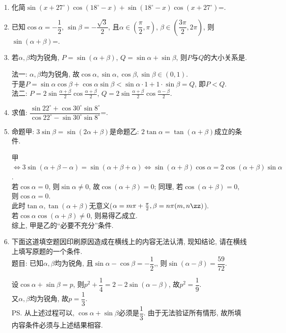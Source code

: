 \begin{enumerate}
\item 化简$\sin(x+27^\circ)\cos(18^\circ-x)+\sin(18^\circ-x)\cos(x+27^\circ)$=. 

\item 已知$\cos\alpha=-\dfrac{1}{2}$, $\sin\beta=-\dfrac{\sqrt{3}}{2}$, 且$\alpha\in\left(\dfrac{\pi}{2},\pi\right)$, $\beta\in\left(\dfrac{3\pi}{2},2\pi\right)$,
则$\sin(\alpha+\beta)$=. 

\item 若$\alpha,\beta$均为锐角, $P=\sin(\alpha+\beta)$, $Q=\sin\alpha+\sin\beta$, 则$P$与$Q$的大小关系是. 
\begin{jieda}
法一: $\alpha,\beta$均为锐角, 故$\cos\alpha,\sin\alpha,\cos\beta,\sin\beta\in(0,1)$. \\
于是$P=\sin\alpha\cos\beta+\cos\alpha\sin\beta<\sin\alpha\cdot 1+1\cdot\sin\beta=Q$, 即$P<Q$. \\
法二: $P=2\sin\frac{\alpha+\beta}{2}\cos\frac{\alpha+\beta}{2}$, $Q=2\sin\frac{\alpha+\beta}{2}\cos\frac{\alpha-\beta}{2}$. 
\end{jieda}

\item 求值: $\dfrac{\sin22^{\circ}+\cos30^{\circ}\sin8^{\circ}}{\cos22^{\circ}-\sin30^{\circ}\sin8^{\circ}}$=. 

\item 命题甲: $3\sin\beta=\sin(2\alpha+\beta)$是命题乙: $2\tan\alpha=\tan(\alpha+\beta)$成立的条件. 
\begin{jieda}
甲$\iff3\sin(\alpha+\beta-\alpha)=\sin(\alpha+\beta+\alpha)\iff \sin(\alpha+\beta)\cos\alpha=2\cos(\alpha+\beta)\sin\alpha$. \\
若$\cos\alpha=0$, 则$\sin\alpha\neq 0$, 故$\cos(\alpha+\beta)=0$; 同理, 若$\cos(\alpha+\beta)=0$, 则$\cos\alpha=0$. \\
此时$\tan\alpha,\tan(\alpha+\beta)$无意义($\alpha=m\pi+\frac{\pi}{2},\beta=n\pi(m,n\zz)$). \\
若$\cos\alpha\cos(\alpha+\beta)\neq 0$, 则易得乙成立. \\
综上, 甲是乙的``必要不充分''条件. 
\end{jieda}


\item 下面这道填空题因印刷原因造成在横线上的内容无法认清, 现知结论, 请在横线上填写原题的一个条件. \\
题目: 已知$\alpha,\beta$均为锐角, 且$\sin\alpha-\cos\beta=-\dfrac{1}{2}$,, 
则$\sin(\alpha-\beta)=\dfrac{59}{72}$. 
\begin{jieda}
设$\cos\alpha+\sin\beta=p$, 则$p^2+\dfrac{1}{4}=2-2\sin(\alpha-\beta)$, 故$p^2=\dfrac{1}{9}$. \\
又$\alpha,\beta$均为锐角, 故$p=\dfrac{1}{3}$. \\
\ps 从上述过程可以, $\cos\alpha+\sin\beta$必须是$\dfrac{1}{3}$. 由于无法验证所有情形, 故所填内容条件必须与上述结果相容. 
\end{jieda}



\end{enumerate}
